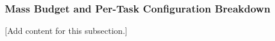
\subsubsection{Mass Budget and Per-Task Configuration Breakdown}
\label{subsubsec:design_11_1_mass_budget_task_breakdown}

[Add content for this subsection.]
